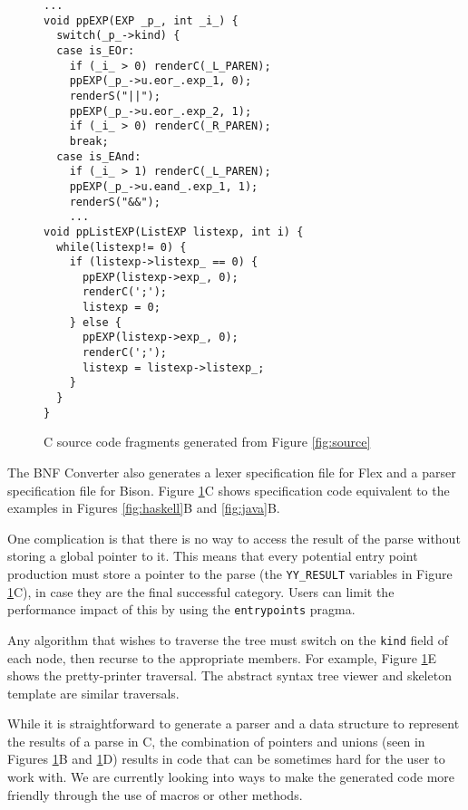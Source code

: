 \begin{figure}
\begin{boxedminipage}[t]{\textwidth}
\begin{minipage}[r]{0.5\textwidth}
\scriptsize
\begin{verbatim}
...
void ppEXP(EXP _p_, int _i_) {
  switch(_p_->kind) {
  case is_EOr:
    if (_i_ > 0) renderC(_L_PAREN);
    ppEXP(_p_->u.eor_.exp_1, 0);
    renderS("||");
    ppEXP(_p_->u.eor_.exp_2, 1);
    if (_i_ > 0) renderC(_R_PAREN);
    break;
  case is_EAnd:
    if (_i_ > 1) renderC(_L_PAREN);
    ppEXP(_p_->u.eand_.exp_1, 1);
    renderS("&&");
    ...
void ppListEXP(ListEXP listexp, int i) {
  while(listexp!= 0) {
    if (listexp->listexp_ == 0) {
      ppEXP(listexp->exp_, 0);
      renderC(';');
      listexp = 0;
    } else {
      ppEXP(listexp->exp_, 0);
      renderC(';');
      listexp = listexp->listexp_;
    }
  }
}
\end{verbatim}
\normalsize
\hfill
\end{minipage}
\end{boxedminipage}
\caption{C source code fragments generated from Figure \ref{fig:source}}
\label{fig:c}
\end{figure}


The BNF Converter also generates a lexer specification file for Flex and a parser specification file for Bison. Figure \ref{fig:c}C shows specification code equivalent to the examples in Figures \ref{fig:haskell}B and \ref{fig:java}B.

One complication is that there is no way to access the result of the parse without storing a global pointer to it. This means that every potential entry point production must store a pointer to the parse (the \texttt{YY\_RESULT} variables in Figure \ref{fig:c}C),
in case they are the final successful category. Users can limit the performance impact of this by using the \texttt{entrypoints} pragma.


Any algorithm that wishes to traverse the tree must switch on the \texttt{kind} field of each node, then recurse to the appropriate members. For example, Figure \ref{fig:c}E shows the pretty-printer traversal. The abstract syntax tree viewer and skeleton template are similar traversals.


While it is straightforward to generate a parser and a data structure to represent the results of a parse in C, the combination of pointers and unions (seen in Figures \ref{fig:c}B and \ref{fig:c}D) results in code that can be sometimes hard for the user to work with. We are currently looking into ways to make the generated code more friendly through the use of macros or other methods.

